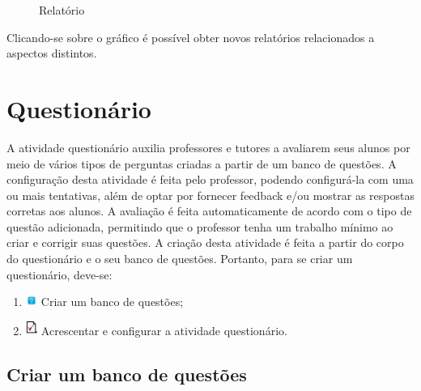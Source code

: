 \begin{figure}[htbp]
 \begin{center}
  \caption{Relatório}
  \label{fig:cap5_63}
 \end{center}
\end{figure}
Clicando-se sobre o gráfico é possível obter novos relatórios relacionados a aspectos distintos.
\section{Questionário}
A atividade questionário auxilia professores e tutores a avaliarem seus alunos por meio de vários tipos de perguntas criadas a partir de um banco de questões. A configuração desta atividade é feita pelo professor, podendo configurá-la com uma ou mais tentativas, além de optar por fornecer feedback e/ou mostrar as respostas corretas aos alunos. A avaliação é feita automaticamente de acordo com o tipo de questão adicionada, permitindo que o professor tenha um trabalho mínimo ao criar e corrigir suas questões. A criação desta atividade é feita a partir do corpo do questionário e o seu banco de questões. Portanto, para se criar um questionário, deve-se:

\begin{enumerate}
 \item \includegraphics[width=0.03\textwidth]{imagem/cap5/fig20.jpg} Criar um banco de questões;
 \item \includegraphics[width=0.03\textwidth]{imagem/cap5/fig21.jpg}  Acrescentar e configurar a atividade questionário. 
\end{enumerate}

\subsection{Criar um banco de questões}


